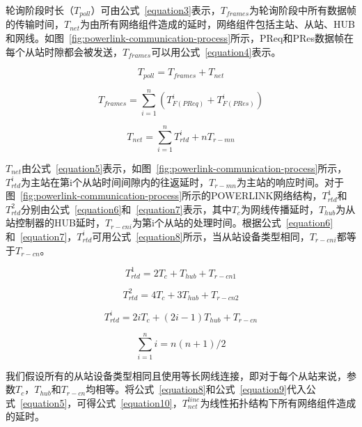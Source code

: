 轮询阶段时长（$T_{poll}$）可由公式~\ref{equation3}表示，$T_{frames}$为轮询阶段中所有数据帧的传输时间，$T_{net}$为由所有网络组件造成的延时，网络组件包括主站、从站、HUB和网线。如图~\ref{fig:powerlink-communication-process}所示，PReq和PRes数据帧在每个从站时隙都会被发送，$T_{frames}$可以用公式~\ref{equation4}表示。

\begin{equation}
\label{equation3}
T_{poll}=T_{frames}+T_{net}
\end{equation}

\begin{equation}
\label{equation4}
T_{frames}=\sum_{i=1}^n(T_{F(PReq)}^{i}+T_{F(PRes)}^{i})
\end{equation}

\begin{equation}
\label{equation5}
T_{net}=\sum_{i=1}^nT_{rtd}^{i}+nT_{r-mn}
\end{equation}

$T_{net}$由公式~\ref{equation5}表示，如图~\ref{fig:powerlink-communication-process}所示，$T_{rtd}^{i}$为主站在第i个从站时间间隙内的往返延时，$T_{r-mn}$为主站的响应时间。对于图~\ref{fig:powerlink-communication-process}所示的POWERLINK网络结构，$T_{rtd}^{1}$和$T_{rtd}^{2}$分别由公式~\ref{equation6}和~\ref{equation7}表示，其中$T_{c}$为网线传播延时，$T_{hub}$为从站控制器的HUB延时，$T_{r-cni}$为第i个从站的处理时间。根据公式~\ref{equation6}和~\ref{equation7}，$T_{rtd}^{i}$可用公式~\ref{equation8}所示，当从站设备类型相同，$T_{r-cni}$都等于$T_{r-cn}$。

\begin{equation}
\label{equation6}
T_{rtd}^{1}=2T_{c}+T_{hub}+T_{r-cn1}
\end{equation}

\begin{equation}
\label{equation7}
T_{rtd}^{2}=4T_{c}+3T_{hub}+T_{r-cn2}
\end{equation}

\begin{equation}
\label{equation8}
T_{rtd}^{i}=2iT_{c}+(2i-1)T_{hub}+T_{r-cn}
\end{equation}

\begin{equation}
\label{equation9}
\sum_{i=1}^ni=n(n+1)/2
\end{equation}

我们假设所有的从站设备类型相同且使用等长网线连接，即对于每个从站来说，参数$T_{c}$，$T_{hub}$和$T_{r-cn}$均相等。将公式~\ref{equation8}和公式~\ref{equation9}代入公式~\ref{equation5}，可得公式~\ref{equation10}，$T_{net}^{line}$为线性拓扑结构下所有网络组件造成的延时。

